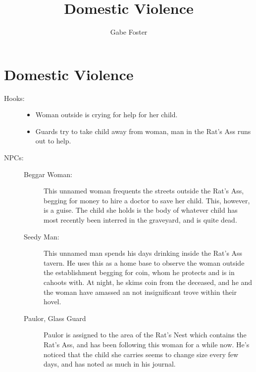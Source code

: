 \documentclass[11pt]{article}
\theoremstyle{definition}
\theoremstyle{remark}
\begin{document}
	\title{Domestic Violence}
	\date{\vspace{-24pt}}
	\author{Gabe Foster}
	\maketitle

\section{Domestic Violence}

\begin{description}

\item[Hooks:] 

\begin{itemize}

\item{Woman outside is crying for help for her child.}

\item{Guards try to take child away from woman, man in the Rat's Ass runs out to help.}

\end{itemize}

\item[NPCs:]
\begin{description}

\item[Beggar Woman:]

This unnamed woman frequents the streets outside the Rat's Ass, begging for money to hire a doctor to save her child.  This, however, is a guise. The child she holds is the body of whatever child has most recently been interred in the graveyard, and is quite dead.

\item[Seedy Man:]

This unnamed man spends his days drinking inside the Rat's Ass tavern. He uses this as a home base to observe the woman outside the establishment begging for coin, whom he protects and is in cahoots with.  At night, he skims coin from the deceased, and he and the woman have amassed an not insignificant trove within their hovel.

\item[Paulor, Glass Guard]

Paulor is assigned to the area of the Rat's Nest which contains the Rat's Ass, and has been following this woman for a while now.  He's noticed that the child she carries seems to change size every few days, and has noted as much in his journal.


\end{description}
\end{description}
\end{document}
